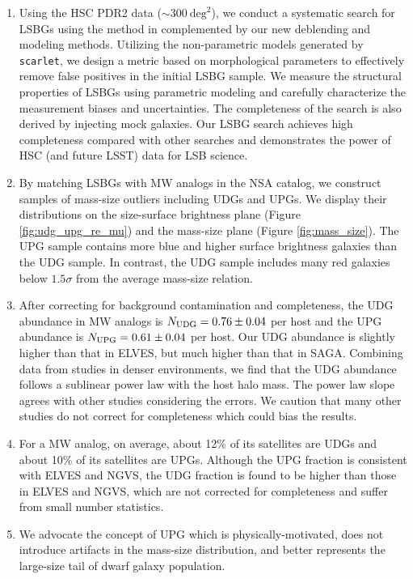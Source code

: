 \documentclass[twocolumn,astrosymb,twocolappendix]{aastex631}
\newcommand{\code}[1]{\texttt{#1}}
\begin{document}
\begin{CJK*}{UTF8}{gbsn}
\begin{enumerate}
    \item Using the HSC PDR2 data ($\sim 300\ \mathrm{deg}^{2}$), we conduct a systematic search for LSBGs using the method in \citet{Greco2018} complemented by our new deblending and modeling methods. Utilizing the non-parametric models generated by \code{scarlet}, we design a metric based on morphological parameters to effectively remove false positives in the initial LSBG sample. We measure the structural properties of LSBGs using parametric modeling and carefully characterize the measurement biases and uncertainties. The completeness of the search is also derived by injecting mock galaxies. Our LSBG search achieves high completeness compared with other searches and demonstrates the power of HSC (and future LSST) data for LSB science. 
    
    \item By matching LSBGs with MW analogs in the NSA catalog, we construct samples of mass-size outliers including UDGs and UPGs. We display their distributions on the size-surface brightness plane (Figure \ref{fig:udg_upg_re_mu}) and the mass-size plane (Figure \ref{fig:mass_size}). The UPG sample contains more blue and higher surface brightness galaxies than the UDG sample. In contrast, the UDG sample includes many red galaxies below $1.5\sigma$ from the average mass-size relation.
    
    \item After correcting for background contamination and completeness, the UDG abundance in MW analogs is $N_{\rm UDG} = 0.76\pm 0.04$ per host and the UPG abundance is $N_{\rm UPG} = 0.61 \pm 0.04$ per host. Our UDG abundance is slightly higher than that in ELVES, but much higher than that in SAGA. Combining data from studies in denser environments, we find that the UDG abundance follows a sublinear power law with the host halo mass. The power law slope agrees with other studies considering the errors. We caution that many other studies do not correct for completeness which could bias the results.
    
    \item For a MW analog, on average, about 12\% of its satellites are UDGs and about 10\% of its satellites are UPGs. Although the UPG fraction is consistent with ELVES and NGVS, the UDG fraction is found to be higher than those in ELVES and NGVS, which are not corrected for completeness and suffer from small number statistics. 
    
    \item We advocate the concept of UPG which is physically-motivated, does not introduce artifacts in the mass-size distribution, and better represents the large-size tail of dwarf galaxy population. 
\end{enumerate}


\end{CJK*}
\end{document}
